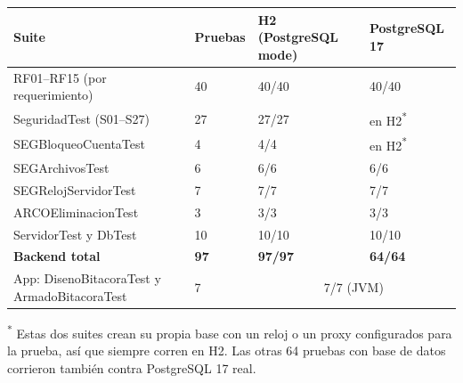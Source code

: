 \begin{table}[H]
\centering\small
\begin{tabular}{p{5.6cm}p{2.4cm}p{2.6cm}p{2.6cm}}
\toprule
\textbf{Suite} & \textbf{Pruebas} & \textbf{H2 (PostgreSQL mode)} & \textbf{PostgreSQL 17}\\\midrule
RF01--RF15 (por requerimiento) & 40 & 40/40 & 40/40\\
SeguridadTest (S01--S27) & 27 & 27/27 & en H2\textsuperscript{*}\\
SEGBloqueoCuentaTest & 4 & 4/4 & en H2\textsuperscript{*}\\
SEGArchivosTest & 6 & 6/6 & 6/6\\
SEGRelojServidorTest & 7 & 7/7 & 7/7\\
ARCOEliminacionTest & 3 & 3/3 & 3/3\\
ServidorTest y DbTest & 10 & 10/10 & 10/10\\
\textbf{Backend total} & \textbf{97} & \textbf{97/97} & \textbf{64/64}\\
App: DisenoBitacoraTest y ArmadoBitacoraTest & 7 & \multicolumn{2}{c}{7/7 (JVM)}\\
\bottomrule
\end{tabular}

\smallskip
\raggedright\footnotesize\textsuperscript{*} Estas dos suites crean su propia base con un reloj o un proxy configurados para la prueba, así que siempre corren en H2. Las otras 64 pruebas con base de datos corrieron también contra PostgreSQL 17 real.
\end{table}
